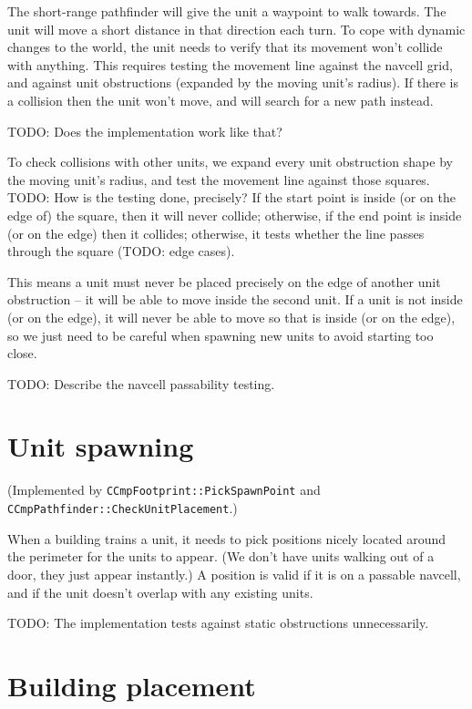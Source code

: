 \documentclass[a4paper,10pt]{article}
\begin{document}
The short-range pathfinder will give the unit a waypoint to walk towards.
The unit will move a short distance in that direction each turn.
To cope with dynamic changes to the world,
the unit needs to verify that its movement won't collide with anything.
This requires testing the movement line against the navcell grid,
and against unit obstructions (expanded by the moving unit's radius).
If there is a collision then the unit won't move, and will search for
a new path instead.

TODO: Does the implementation work like that?

To check collisions with other units,
we expand every unit obstruction shape by the moving unit's radius,
and test the movement line against those squares.
TODO: How is the testing done, precisely?
If the start point is inside (or on the edge of) the square,
then it will never collide;
otherwise, if the end point is inside (or on the edge)
then it collides;
otherwise, it tests whether the line passes through the square
(TODO: edge cases).

This means a unit must never be placed precisely on the edge
of another unit obstruction -- it will be able to move inside the second unit.
If a unit is not inside (or on the edge),
it will never be able to move so that is inside (or on the edge),
so we just need to be careful when spawning new units to avoid starting too close.

TODO: Describe the navcell passability testing.

\section{Unit spawning}

(Implemented by \texttt{CCmpFootprint::PickSpawnPoint}
and \texttt{CCmpPathfinder::CheckUnitPlacement}.)

When a building trains a unit, it needs to pick positions nicely located
around the perimeter for the units to appear.
(We don't have units walking out of a door, they just appear instantly.)
A position is valid if it is on a passable navcell,
and if the unit doesn't overlap with any existing units.

TODO: The implementation tests against static obstructions unnecessarily.

\section{Building placement}
\end{document}
